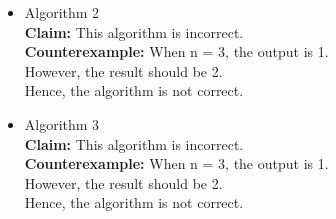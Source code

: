\documentclass[12pt]{article}
\begin{document}
\begin{itemize}
    \item Algorithm 2\\
        \textbf{Claim:} This algorithm is incorrect.\\
        \textbf{Counterexample:} When n = 3, the output is 1.\\
        However, the result should be 2.\\
        Hence, the algorithm is not correct.
    
    \item Algorithm 3\\
        \textbf{Claim:} This algorithm is incorrect.\\
        \textbf{Counterexample:} When n = 3, the output is 1.\\
        However, the result should be 2.\\
        Hence, the algorithm is not correct.

\end{itemize}
 
\end{document}
